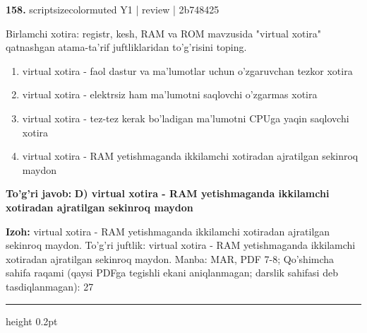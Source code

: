 \documentclass[10pt,a4paper]{article}
\begin{document}
{\bfseries\sffamily\color{ink} 158.} {scriptsizecolor{muted} Y1 | review | 2b748425}
\par
Birlamchi xotira: registr, kesh, RAM va ROM mavzusida "virtual xotira" qatnashgan atama-ta'rif juftliklaridan to'g'risini toping.
\begin{enumerate}[label=\Alph*),leftmargin=9mm]
\item virtual xotira - faol dastur va ma'lumotlar uchun o'zgaruvchan tezkor xotira
\item virtual xotira - elektrsiz ham ma'lumotni saqlovchi o'zgarmas xotira
\item virtual xotira - tez-tez kerak bo'ladigan ma'lumotni CPUga yaqin saqlovchi xotira
\item virtual xotira - RAM yetishmaganda ikkilamchi xotiradan ajratilgan sekinroq maydon
\end{enumerate}
\begin{tcolorbox}[enhanced,breakable,colback=teal!4,colframe=teal!60!black,boxrule=0.45pt,arc=1.2mm,left=2.7mm,right=2.7mm,top=1.8mm,bottom=1.8mm,before skip=2mm,after skip=2mm]
{\bfseries\sffamily\color{teal}To'g'ri javob:} \textbf{D) virtual xotira - RAM yetishmaganda ikkilamchi xotiradan ajratilgan sekinroq maydon}
\par\smallskip
{\bfseries Izoh:} virtual xotira - RAM yetishmaganda ikkilamchi xotiradan ajratilgan sekinroq maydon. To'g'ri juftlik: virtual xotira - RAM yetishmaganda ikkilamchi xotiradan ajratilgan sekinroq maydon. Manba: MAR, PDF 7-8; Qo'shimcha sahifa raqami (qaysi PDFga tegishli ekani aniqlanmagan; darslik sahifasi deb tasdiqlanmagan): 27
\end{tcolorbox}
\vspace{2mm}\hrule height 0.2pt\vspace{3mm}
\end{document}
